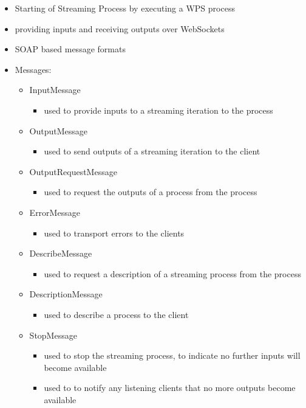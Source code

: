 	\begin{itemize}
		\item Starting of Streaming Process by executing a WPS process
		\item providing inputs and receiving outputs over WebSockets
		\item SOAP based message formats
		\item Messages:
		\begin{itemize}
			\item InputMessage
			\begin{itemize}
				\item used to provide inputs to a streaming iteration to the process
			\end{itemize}
			\item OutputMessage
			\begin{itemize}
				\item used to send outputs of a streaming iteration to the client
			\end{itemize}
			\item OutputRequestMessage
			\begin{itemize}
				\item used to request the outputs of a process from the process
			\end{itemize}
			\item ErrorMessage
			\begin{itemize}
				\item used to transport errors to the clients
			\end{itemize}
			\item DescribeMessage
			\begin{itemize}
				\item used to request a description of a streaming process from the process
			\end{itemize}
			\item DescriptionMessage
			\begin{itemize}
				\item used to describe a process to the client
			\end{itemize}
			\item StopMessage
			\begin{itemize}
				\item used to stop the streaming process, to indicate no further inputs will become available
				\item used to to notify any listening clients that no more outputs become available
			\end{itemize}
		\end{itemize}
	\end{itemize}
